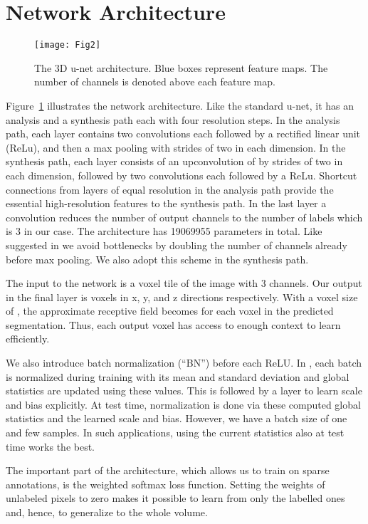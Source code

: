 \documentclass[runningheads,a4paper]{llncs}
\begin{document}
\section{Network Architecture}

\begin{figure}
\centering
\texttt{[image: Fig2]}
\caption{The 3D u-net architecture. Blue boxes represent feature maps. The number of channels is denoted above each feature map.}
\label{fig:unet3d}
\end{figure}

Figure~\ref{fig:unet3d} illustrates the network architecture. Like the standard u-net, it has an analysis and a synthesis path each with four resolution steps. In the analysis path, each layer contains two  convolutions each followed by a rectified linear unit (ReLu), and then a  max pooling with strides of two in each dimension. In the synthesis path, each layer consists of an upconvolution of  by strides of two in each dimension, followed by two  convolutions each followed by a ReLu. Shortcut connections from layers of equal resolution in the analysis path provide the essential high-resolution features to the synthesis path. 
In the last layer a  convolution reduces the number of output channels to the number of labels which is 3 in our case. The architecture has 19069955 parameters in total.
Like suggested in \cite{google} we avoid bottlenecks by doubling the number of channels already before max pooling. We also adopt this scheme in the synthesis path. 

The input to the network is a  voxel tile of the image with 3 channels. Our output in the final layer is  voxels in x, y, and z directions respectively. With a voxel size of , the approximate receptive field becomes  for each voxel in the predicted segmentation. Thus, each output voxel has access to enough context to learn efficiently. 

We also introduce batch normalization (``BN'') before each ReLU. In \cite{bn}, each batch is normalized during training with its mean and standard deviation and global statistics are updated using these values. This is followed by a layer to learn scale and bias explicitly. At test time, normalization is done via these computed global statistics and the learned scale and bias. However, we have a batch size of one and few samples. In such applications, using the current statistics also at test time works the best. 

The important part of the architecture, which allows us to train on sparse annotations, is the weighted softmax loss function. Setting the weights of unlabeled pixels to zero makes it possible to learn from only the labelled ones and, hence, to generalize to the whole volume. 
\end{document}
